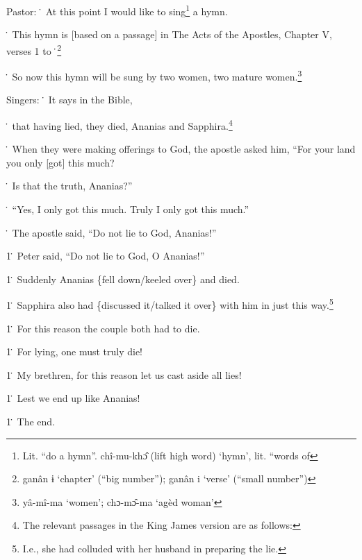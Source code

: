 
Pastor: \. At this point I would like to sing\footnote{Lit. ``do a hymn''. chî-mu-khɔ̂ (lift high word) `hymn', lit. ``words of} a hymn.

\. This hymn is [based on a passage] in The Acts of the Apostles, Chapter V, verses
1 to \.\footnote{ganân ɨ `chapter' (``big number''); ganân i `verse' (``small number'')}

\. So now this hymn will be sung by two women, two mature women.\footnote{yâ-mî-ma `women'; chɔ-mɔ̂-ma `agèd woman'}

Singers: \. It says in the Bible,

\. that having lied, they died, Ananias and Sapphira.\footnote{The relevant passages in the King James version are as follows:}

\. When they were making offerings to God, the apostle asked him, ``For your land
you only [got] this much?

\. Is that the truth, Ananias?''

\. ``Yes, I only got this much. Truly I only got this much.''

\. The apostle said, ``Do not lie to God, Ananias!''

1\. Peter said, ``Do not lie to God, O Ananias!''

1\. Suddenly Ananias \{fell down/keeled over\} and died.

1\. Sapphira also had \{discussed it/talked it over\} with him in just this way.\footnote{I.e., she had colluded with her husband in preparing the lie.}

1\. For this reason the couple both had to die.

1\. For lying, one must truly die!

1\. My brethren, for this reason let us cast aside all lies!

1\. Lest we end up like Ananias!

1\. The end.

